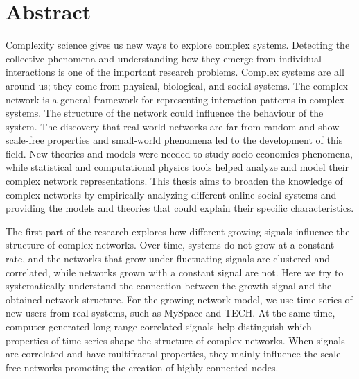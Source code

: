 
\normalsize


\chapter{Abstract}

Complexity science gives us new ways to explore complex systems. Detecting the collective phenomena and understanding how they emerge from individual interactions is one of the important research problems. Complex systems are all around us; they come from physical, biological, and social systems. The complex network is a general framework for representing interaction patterns in complex systems. The structure of the network could influence the behaviour of the system. The discovery that real-world networks are far from random and show scale-free properties and small-world phenomena led to the development of this field. New theories and models were needed to study socio-economics phenomena, while statistical and computational physics tools helped analyze and model their complex network representations. %
This thesis aims to broaden the knowledge of complex networks by empirically analyzing different online social systems and providing the models and theories that could explain their specific characteristics.  

The first part of the research explores how different growing signals influence the structure of complex networks. Over time, systems do not grow at a constant rate, and the networks that grow under fluctuating signals are clustered and correlated, while networks grown with a constant signal are not. Here we try to systematically understand the connection between the growth signal and the obtained network structure. For the growing network model, we use time series of new users from real systems, such as MySpace and TECH. At the same time, computer-generated long-range correlated signals help distinguish which properties of time series shape the structure of complex networks. When signals are correlated and have multifractal properties, they mainly influence the scale-free networks promoting the creation of highly connected nodes. 

